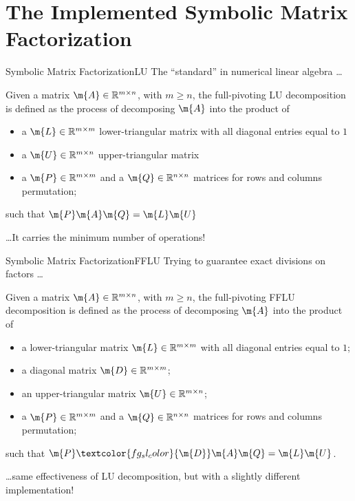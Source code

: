 
\section{The Implemented Symbolic Matrix Factorization}

\begin{frame}{Symbolic Matrix Factorization}{\acf{LU}}
  The ``standard'' in numerical linear algebra \dots
  \begin{bbox}
    Given a matrix $\m{A} \in \mathbb{R}^{m \times n}$, with $m \geq n$, the full-pivoting \acs{LU} decomposition is defined as the process of decomposing $\m{A}$ into the product of
    \begin{itemize}
      \item a $\m{L} \in \mathbb{R}^{m \times m}$ lower-triangular matrix with all diagonal entries equal to $1$
      \item a $\m{U} \in \mathbb{R}^{m \times n}$ upper-triangular matrix
      \item a $\m{P} \in \mathbb{R}^{m \times m}$ and a $\m{Q} \in \mathbb{R}^{n \times n}$ matrices for rows and columns permutation;
    \end{itemize}
    such that $\m{P}\m{A}\m{Q} = \m{L}\m{U}$
  \end{bbox}
  \dots It carries the minimum number of operations!
\end{frame}

\begin{frame}{Symbolic Matrix Factorization}{\acf{FFLU}}
  Trying to guarantee exact divisions on factors \dots
  \begin{bbox}
    Given a matrix $\m{A} \in \mathbb{R}^{m \times n}$, with $m \geq n$, the full-pivoting \acs{FFLU} decomposition is defined as the process of decomposing $\m{A}$ into the product of
    \begin{itemize}
      \item a lower-triangular matrix $\m{L} \in \mathbb{R}^{m \times m}$ with all diagonal entries equal to $1$;
      \item \textcolor{fg_sl_color}{a diagonal matrix $\m{D} \in \mathbb{R}^{m \times m}$;}
      \item an upper-triangular matrix $\m{U} \in \mathbb{R}^{m \times n}$;
      \item a $\m{P} \in \mathbb{R}^{m \times m}$ and a $\m{Q} \in \mathbb{R}^{n \times n}$ matrices for rows and columns permutation;
    \end{itemize}
    such that $\m{P}\textcolor{fg_sl_color}{\m{D}}\m{A}\m{Q} = \m{L}\m{U}$.
  \end{bbox}
  \dots same effectiveness of \acs{LU} decomposition, but with a slightly different implementation!
\end{frame}

